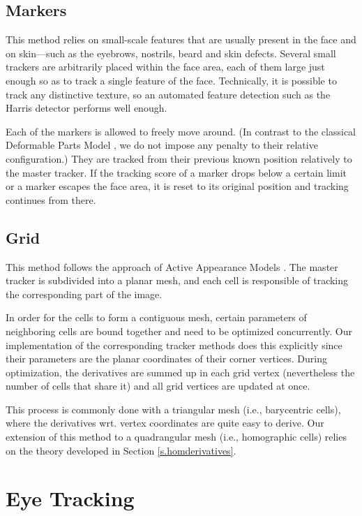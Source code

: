 \subsection{Markers}

This method relies on small-scale features that are usually present in the face and on skin---such as the eyebrows, nostrils, beard and skin defects.
Several small trackers are arbitrarily placed within the face area, each of them large just enough so as to track a single feature of the face.
Technically, it is possible to track any distinctive texture, so an automated feature detection such as the Harris detector  performs well enough.

Each of the markers is allowed to freely move around.
(In contrast to the classical Deformable Parts Model , we do not impose any penalty to their relative configuration.)
They are tracked from their previous known position relatively to the master tracker.
If the tracking score of a marker drops below a certain limit or a marker escapes the face area, it is reset to its original position and tracking continues from there.

\subsection{Grid}

This method follows the approach of Active Appearance Models .
The master tracker is subdivided into a planar mesh, and each cell is responsible of tracking the corresponding part of the image.

In order for the cells to form a contiguous mesh, certain parameters of neighboring cells are bound together and need to be optimized concurrently.
Our implementation of the corresponding tracker methods does this explicitly since their parameters are the planar coordinates of their corner vertices.
During optimization, the derivatives are summed up in each grid vertex (nevertheless the number of cells that share it) and all grid vertices are updated at once.

This process is commonly done with a triangular mesh (i.e., barycentric cells), where the derivatives wrt. vertex coordinates are quite easy to derive.
Our extension of this method to a quadrangular mesh (i.e., homographic cells) relies on the theory developed in Section \ref{s.homderivatives}.

\section{Eye Tracking}

